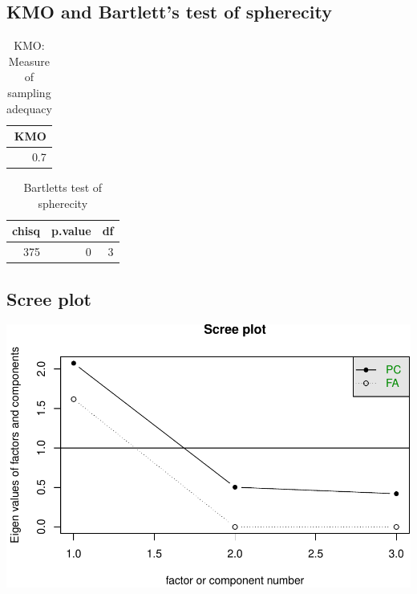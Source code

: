 \documentclass[]{article}
\begin{document}
\hypertarget{kmo-and-bartletts-test-of-spherecity-7}{%
\subsection{KMO and Bartlett's test of
spherecity}\label{kmo-and-bartletts-test-of-spherecity-7}}

\begin{table}[H]

\caption{\label{tab:unnamed-chunk-39}KMO: Measure of sampling adequacy}
\centering
\fontsize{6}{8}\selectfont
\begin{tabular}[t]{r}
\toprule
KMO\\
\midrule
0.7\\
\bottomrule
\end{tabular}
\end{table}

\begin{table}[H]

\caption{\label{tab:unnamed-chunk-39}Bartletts test of spherecity}
\centering
\fontsize{6}{8}\selectfont
\begin{tabular}[t]{rrr}
\toprule
chisq & p.value & df\\
\midrule
375 & 0 & 3\\
\bottomrule
\end{tabular}
\end{table}

\hypertarget{scree-plot-7}{%
\subsection{Scree plot}\label{scree-plot-7}}

\includegraphics{PCA_covid_files/figure-latex/unnamed-chunk-40-1.pdf}
\end{document}
